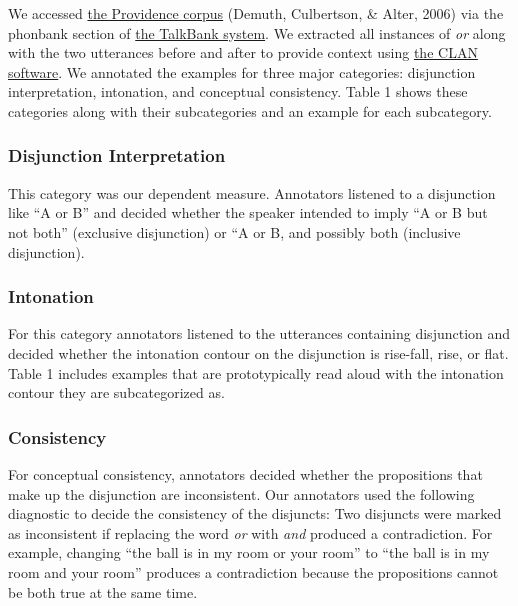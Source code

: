 \documentclass[10pt, letterpaper]{article}
\begin{document}
We accessed
\href{https://phonbank.talkbank.org/browser/index.php?url=Eng-NA/Providence/}{the
Providence corpus} (Demuth, Culbertson, \& Alter, 2006) via the phonbank
section of \href{https://talkbank.org/}{the TalkBank system}. We
extracted all instances of \emph{or} along with the two utterances
before and after to provide context using
\href{http://alpha.talkbank.org/clan/}{the CLAN software}. We annotated
the examples for three major categories: disjunction interpretation,
intonation, and conceptual consistency. Table 1 shows these categories
along with their subcategories and an example for each subcategory.

\subsubsection{Disjunction
Interpretation}\label{disjunction-interpretation}

This category was our dependent measure. Annotators listened to a
disjunction like ``A or B'' and decided whether the speaker intended to
imply ``A or B but not both'' (exclusive disjunction) or ``A or B, and
possibly both (inclusive disjunction).

\subsubsection{Intonation}\label{intonation}

For this category annotators listened to the utterances containing
disjunction and decided whether the intonation contour on the
disjunction is rise-fall, rise, or flat. Table 1 includes examples that
are prototypically read aloud with the intonation contour they are
subcategorized as.

\subsubsection{Consistency}\label{consistency}

For conceptual consistency, annotators decided whether the propositions
that make up the disjunction are inconsistent. Our annotators used the
following diagnostic to decide the consistency of the disjuncts: Two
disjuncts were marked as inconsistent if replacing the word \emph{or}
with \emph{and} produced a contradiction. For example, changing ``the
ball is in my room or your room'' to ``the ball is in my room and your
room'' produces a contradiction because the propositions cannot be both
true at the same time.
\end{document}
